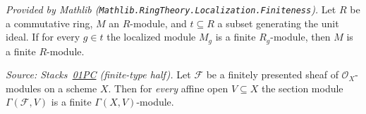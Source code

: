 \begin{lemma}
  \label{lem:module_finite_of_localizationSpan_mathlib}
  \mathlibok
  \textit{Provided by Mathlib
  (\texttt{Mathlib.RingTheory.Localization.Finiteness}).}
  Let \(R\) be a commutative ring, \(M\) an \(R\)-module, and
  \(t \subseteq R\) a subset generating the unit ideal.  If for every
  \(g \in t\) the localized module \(M_g\) is a finite \(R_g\)-module, then
  \(M\) is a finite \(R\)-module.
\end{lemma}

\begin{lemma}
  \label{lem:finite_sections_affine_all}
  \textit{Source: Stacks~\href{https://stacks.math.columbia.edu/tag/01PC}{01PC}
  (finite-type half).}
  Let \(\mathcal{F}\) be a finitely presented sheaf of
  \(\mathcal{O}_X\)-modules on a scheme \(X\).  Then for \emph{every} affine
  open \(V \subseteq X\) the section module \(\Gamma(\mathcal{F}, V)\) is a
  finite \(\Gamma(X, V)\)-module.
\end{lemma}
